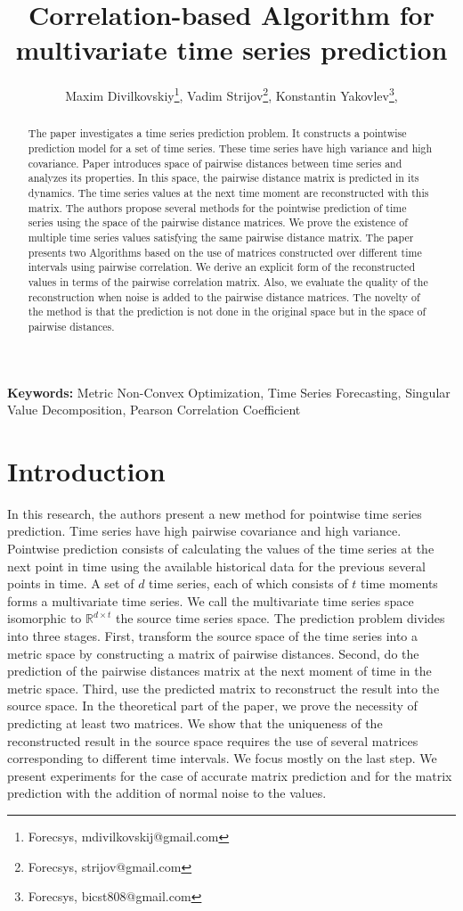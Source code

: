 \documentclass[12pt]{article}
\title{Correlation-based Algorithm for multivariate time series prediction}
\author{%
	Maxim Divilkovskiy\footnote{Forecsys, mdivilkovskij@gmail.com},  %
	Vadim Strijov\footnote{Forecsys,  strijov@gmail.com},  %
	Konstantin Yakovlev\footnote{Forecsys,  bicst808@gmail.com},  %
}
\begin{document}
\maketitle

\begin{abstract}
The paper investigates a time series prediction problem. It constructs a pointwise prediction model for a set of time series. These time series have high variance and high covariance. Paper introduces space of pairwise distances between time series and analyzes its properties. In this space, the pairwise distance matrix is predicted in its dynamics. The time series values at the next time moment are reconstructed with this matrix. The authors propose several methods for the pointwise prediction of time series using the space of the pairwise distance matrices. We prove the existence of multiple time series values satisfying the same pairwise distance matrix. The paper presents two Algorithms based on the use of matrices constructed over different time intervals using pairwise correlation. We derive an explicit form of the reconstructed values in terms of the pairwise correlation matrix. Also, we evaluate the quality of the reconstruction when noise is added to the pairwise distance matrices. The novelty of the method is that the prediction is not done in the original space but in the space of pairwise distances.


\end{abstract}

\textbf{Keywords:} Metric Non-Convex Optimization, Time Series Forecasting, Singular Value Decomposition, Pearson Correlation Coefficient

\section{Introduction}
 	In this research, the authors present a new method for pointwise time series prediction. Time series have high pairwise covariance and high variance. Pointwise prediction consists of calculating the values of the time series at the next point in time using the available historical data for the previous several points in time. A set of $d$ time series, each of which consists of $t$ time moments forms a multivariate time series. We call the multivariate time series space isomorphic to $\mathbb{R}^{d \times t}$ the source time series space. The prediction problem divides into three stages. First, transform the source space of the time series into a metric space by constructing a matrix of pairwise distances. Second, do the prediction of the pairwise distances matrix at the next moment of time in the metric space. Third, use the predicted matrix to reconstruct the result into the source space. In the theoretical part of the paper, we prove the necessity of predicting at least two matrices. We show that the uniqueness of the reconstructed result in the source space requires the use of several matrices corresponding to different time intervals. We focus mostly on the last step. We present experiments for the case of accurate matrix prediction and for the matrix prediction with the addition of normal noise to the values.
\end{document}
